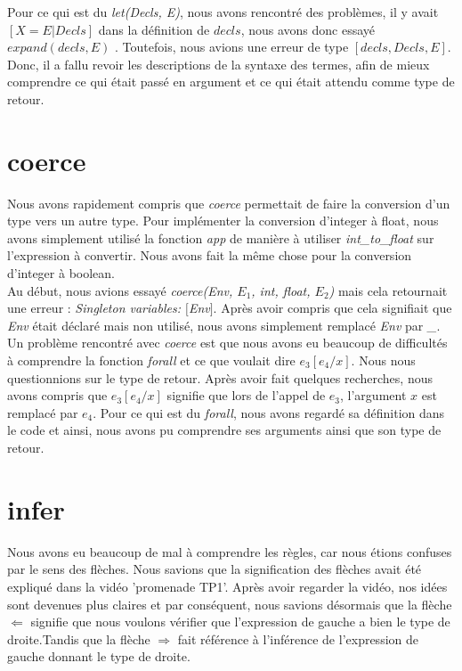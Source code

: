 \documentclass{article}
\begin{document}
Pour ce qui est du \textit{let(Decls, E)}, nous avons rencontré des problèmes, il y avait $[X = E|Decls]$ dans la définition de $decls$, nous avons donc essayé $expand(decls, E)$ . Toutefois, nous avions une erreur de type $[decls, Decls, E]$. Donc, il a fallu revoir les descriptions de la syntaxe des termes, afin de mieux comprendre ce qui était passé en argument et ce qui était attendu comme type de retour. 

\section{coerce}
Nous avons rapidement compris que \textit{coerce} permettait de faire la conversion d'un type vers un autre type. Pour implémenter la conversion d'integer à float, nous avons simplement utilisé la fonction \textit{app} de manière à utiliser \textit{int\_to\_float} sur l'expression à convertir. Nous avons fait la même chose pour la conversion d'integer à boolean. \\

Au début, nous avions essayé \textit{coerce(Env, $E_1$, int, float, $E_2$)} mais cela retournait une erreur : \textit{Singleton variables: $[$Env$]$}. Après avoir compris que cela signifiait que \textit{Env} était déclaré mais non utilisé, nous avons simplement remplacé \textit{Env} par \textit{\_}.\\

Un problème rencontré avec \textit{coerce} est que nous avons eu beaucoup de difficultés à comprendre la fonction \textit{forall} et ce que voulait dire $e_3[e_4/x]$. Nous nous questionnions sur le type de retour. Après avoir fait quelques recherches, nous avons compris que $e_3[e_4/x]$ signifie que lors de l'appel de $e_3$, l'argument $x$ est remplacé par $e_4$. Pour ce qui est du \textit{forall}, nous avons regardé sa définition dans le code et ainsi, nous avons pu comprendre ses arguments ainsi que son type de retour.


\section{infer}
Nous avons eu beaucoup de mal à comprendre les règles, car nous étions confuses par le sens des flèches. Nous savions que la signification des flèches avait été expliqué dans la vidéo 'promenade TP1'. Après avoir regarder la vidéo, nos idées sont devenues plus claires et par conséquent, nous savions désormais que la flèche $\Leftarrow$ signifie que nous voulons vérifier que l'expression de gauche a bien le type de droite.Tandis que la flèche $\Rightarrow$ fait référence à l'inférence de l'expression de gauche donnant le type de droite.\\
\end{document}
